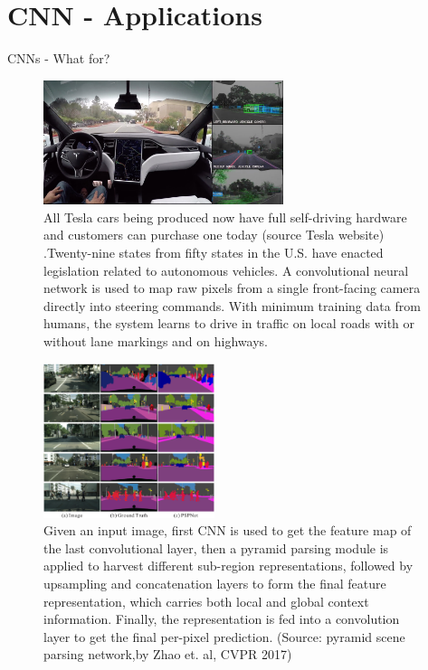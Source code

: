 \section{CNN - Applications}

\begin{vbframe}{CNNs - What for?}
  \begin{figure}
    \centering
    \includegraphics[width=7cm]{plots/tesla_autopilot.jpg}
    \caption{All Tesla cars being produced now have full self-driving hardware and customers can purchase one today (source Tesla website) .Twenty-nine states from fifty states in the U.S. have enacted legislation related to autonomous vehicles. A convolutional neural network is used to map raw pixels from a single front-facing camera directly into steering commands. With minimum training data from humans, the system learns to drive in traffic on local roads with or without lane markings and on highways.}
  \end{figure}
\framebreak
  \begin{figure}
    \centering
    \includegraphics[width=5cm]{plots/cityscapes_visual.png}
    \caption{Given an input image, first CNN is used to get the feature map of the last convolutional layer, then a pyramid parsing module is applied to harvest different sub-region representations, followed by upsampling and concatenation layers to form the final feature representation, which carries both local and global context information. Finally, the representation is fed into a convolution layer to get the final per-pixel prediction. (Source: pyramid scene parsing network,by Zhao et. al, CVPR 2017) }

\end{figure}
\end{vbframe}
